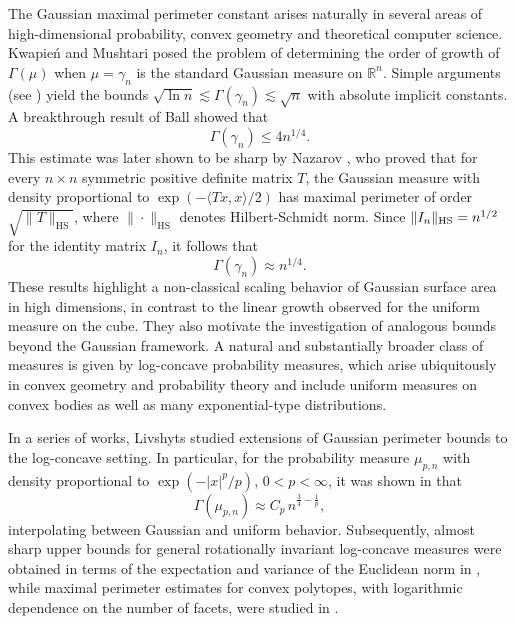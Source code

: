 \documentclass[11pt,leqno]{article}
\theoremstyle{remark}
\numberwithin{equation}{section}
\newcommand{\ls}{\leqslant}
\begin{document}
The Gaussian maximal perimeter constant arises naturally in several areas of high-dimensional probability, convex geometry and theoretical computer science.
Kwapie\'{n} and Mushtari posed the problem of determining the order of growth of $\Gamma(\mu)$ when $\mu=\gamma_n$ is the standard Gaussian measure on $\mathbb{R}^n$.
Simple arguments (see \cite{Ball-1993}) yield the bounds $\sqrt{\ln n}\lesssim \Gamma(\gamma_n)\lesssim \sqrt{n}$ with absolute implicit constants.
A breakthrough result of Ball \cite{Ball-1993} showed that
$$\Gamma(\gamma_n)\ls 4n^{1/4}.$$
This estimate was later shown to be sharp by Nazarov \cite{Nazarov-2003}, who proved that for every $n\times n$ symmetric positive definite matrix $T$, the Gaussian measure with density proportional to $\exp(-\langle Tx,x\rangle/2)$ has maximal perimeter of order $\sqrt{\|T\|_{\mathrm{HS}}}$, where $\|\cdot\|_{\mathrm{HS}}$ denotes Hilbert-Schmidt norm. 
Since $\|I_n\|_{{\rm HS}}=n^{1/2}$ for the identity matrix $I_n$, it follows that
\begin{equation}\label{eq:gaussian}
\Gamma(\gamma_n)\approx n^{1/4}.
\end{equation}
These results highlight a non-classical scaling behavior of Gaussian surface area in high dimensions, in contrast to the
linear growth observed for the uniform measure on the cube. They also motivate the investigation of analogous bounds beyond the Gaussian framework. 
A natural and substantially broader class of measures is given by log-concave probability measures, which arise ubiquitously in convex geometry and probability theory and include uniform measures on convex bodies as well as many exponential-type distributions.  

In a series of works, Livshyts studied extensions of Gaussian perimeter bounds to the log-concave setting.
In particular, for the probability measure $\mu_{p,n}$ with density proportional to $\exp(-|x|^p/p)$, $0<p<\infty$, it was shown in \cite{Livshyts-2013} that
$$\Gamma(\mu_{p,n})\approx C_p\,n^{\frac{3}{4}-\frac{1}{p}},$$
interpolating between Gaussian and uniform behavior. 
Subsequently, almost sharp upper bounds for general rotationally invariant log-concave measures were obtained in terms of the expectation and variance of the Euclidean norm in \cite{Livshyts-2014}, while maximal perimeter estimates for convex polytopes, with logarithmic dependence on the number of facets, were studied in \cite{Livshyts-2015}.
\end{document}
